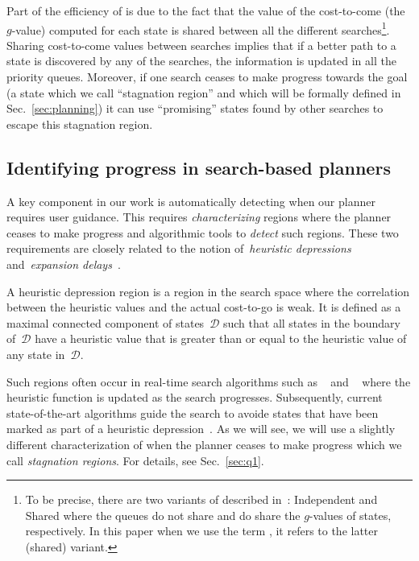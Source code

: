 \documentclass{article}
\begin{document}
Part of the efficiency of \mhastar is due to the fact that the value of the cost-to-come (the $g$-value) computed for each state is shared between all the different searches\footnote{To be precise, there are two variants of \mhastar described in~\cite{ASNHL16}: Independent and Shared \mhastar where the queues do not share and do share the $g$-values of states, respectively. In this paper when we use the term \mhastar, it refers to the latter (shared) variant.}.
Sharing cost-to-come values between searches implies that if a better path to a state is discovered by any of the searches, the information is updated in all the
priority queues. 
Moreover, if one search ceases to make progress towards the goal (a state which we call ``stagnation region'' and which will be formally defined in Sec.~\ref{sec:planning}) it can use ``promising'' states found by other searches to escape this stagnation region.

\subsection{Identifying progress in search-based planners}

A key component in our work is automatically detecting when our planner requires user guidance.
This requires \emph{characterizing} regions where the planner ceases to make progress and algorithmic tools to \emph{detect} such regions. 
These two requirements are closely related to the notion of~\emph{heuristic depressions}~\cite{I92}
and~\emph{expansion delays}~\cite{DTR11,BRD13}.

A heuristic depression region is a  region in the search space where the correlation between the heuristic values and the actual cost-to-go is weak.
It is defined as a maximal connected component of states~$\mathcal{D}$ such that all states in the boundary of~$\mathcal{D}$ have a heuristic value that is greater than or equal to the heuristic value of any state in~$\mathcal{D}$.

Such regions often occur in real-time search algorithms such as ~\cite{K90} and ~\cite{KS09} where the heuristic function is updated as the search progresses.
Subsequently, current state-of-the-art algorithms  guide the search to avoide states that have been marked as part of a heuristic depression~\cite{HB12}.
As we will see, we will use a slightly different characterization of when the planner ceases to make progress which we call \emph{stagnation regions}. For details, see Sec.~\ref{sec:q1}. 
\end{document}

